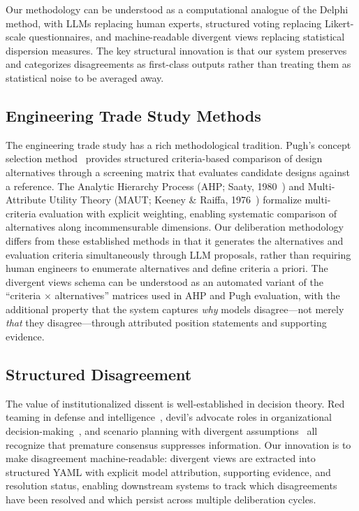\documentclass[11pt,a4paper]{article}
\begin{document}
Our methodology can be understood as a computational analogue of the Delphi method, with LLMs replacing human experts, structured voting replacing Likert-scale questionnaires, and machine-readable divergent views replacing statistical dispersion measures. The key structural innovation is that our system preserves and categorizes disagreements as first-class outputs rather than treating them as statistical noise to be averaged away.

\subsection{Engineering Trade Study Methods}

The engineering trade study has a rich methodological tradition. Pugh's concept selection method~\cite{pugh1991total} provides structured criteria-based comparison of design alternatives through a screening matrix that evaluates candidate designs against a reference. The Analytic Hierarchy Process (AHP; Saaty, 1980~\cite{saaty1980ahp}) and Multi-Attribute Utility Theory (MAUT; Keeney \& Raiffa, 1976~\cite{keeney1976decisions}) formalize multi-criteria evaluation with explicit weighting, enabling systematic comparison of alternatives along incommensurable dimensions. Our deliberation methodology differs from these established methods in that it generates the alternatives and evaluation criteria simultaneously through LLM proposals, rather than requiring human engineers to enumerate alternatives and define criteria a priori. The divergent views schema can be understood as an automated variant of the ``criteria $\times$ alternatives'' matrices used in AHP and Pugh evaluation, with the additional property that the system captures \emph{why} models disagree---not merely \emph{that} they disagree---through attributed position statements and supporting evidence.

\subsection{Structured Disagreement}

The value of institutionalized dissent is well-established in decision theory. Red teaming in defense and intelligence~\cite{zenko2015red}, devil's advocate roles in organizational decision-making~\cite{schwenk1990effects}, and scenario planning with divergent assumptions~\cite{schwartz1996art} all recognize that premature consensus suppresses information. Our innovation is to make disagreement machine-readable: divergent views are extracted into structured YAML with explicit model attribution, supporting evidence, and resolution status, enabling downstream systems to track which disagreements have been resolved and which persist across multiple deliberation cycles.
\end{document}
